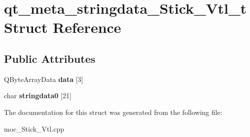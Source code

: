 \hypertarget{structqt__meta__stringdata__Stick__Vtl__t}{}\section{qt\+\_\+meta\+\_\+stringdata\+\_\+\+Stick\+\_\+\+Vtl\+\_\+t Struct Reference}
\label{structqt__meta__stringdata__Stick__Vtl__t}
\subsection*{Public Attributes}
\begin{DoxyCompactItemize}
\item 
Q\+Byte\+Array\+Data {\bfseries data} \mbox{[}3\mbox{]}\hypertarget{structqt__meta__stringdata__Stick__Vtl__t_aa4438838bc2b610595d5ae59ee147e6c}{}\label{structqt__meta__stringdata__Stick__Vtl__t_aa4438838bc2b610595d5ae59ee147e6c}

\item 
char {\bfseries stringdata0} \mbox{[}21\mbox{]}\hypertarget{structqt__meta__stringdata__Stick__Vtl__t_af43642e23db4716197d8169fba2804fe}{}\label{structqt__meta__stringdata__Stick__Vtl__t_af43642e23db4716197d8169fba2804fe}

\end{DoxyCompactItemize}


The documentation for this struct was generated from the following file\+:\begin{DoxyCompactItemize}
\item 
moc\+\_\+\+Stick\+\_\+\+Vtl.\+cpp\end{DoxyCompactItemize}
